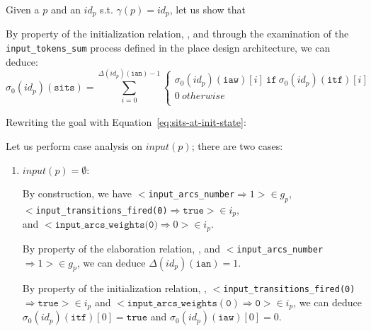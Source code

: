 \documentclass[dvipsnames,12pt]{article}
\begin{document}
\begin{niproof}
  Given a $p$ and an $id_p$ s.t. $\gamma(p)=id_p$, let us show that

  \exP{}
  
  By property of the initialization relation, \InCsCompP{}, and
  through the examination of the \texttt{input\_tokens\_sum} process
  defined in the place design architecture, we can deduce:
  \begin{equation}
    \label{eq:sits-at-init-state}
    \sigma_0(id_p)(\texttt{sits})=\sum\limits_{i=0}^{\Delta(id_p)(\texttt{ian})-1}
    \begin{cases}
      \sigma_0(id_p)(\texttt{iaw})[i]~\mathtt{if}~\sigma_0(id_p)(\texttt{itf})[i]\\
      0~otherwise \\
    \end{cases}
  \end{equation}
  
  Rewriting the goal with Equation~\eqref{eq:sits-at-init-state}:\\

  \noindent{}Let us perform case analysis on $input(p)$; there are two cases:

  \begin{enumerate}
  \item $input(p)=\emptyset$:
    
    By construction, we have
    ${<}$\texttt{input\_arcs\_number}$\Rightarrow{}1{>}\in{}g_p$,\\
    ${<}$\texttt{input\_transitions\_fired(0)}$\Rightarrow{}\mathtt{true}{>}\in{}i_p$,\\
    and
    ${<}\texttt{input\_arcs\_weights(0)}\Rightarrow{}0{>}\in{}i_p$.

  By property of the elaboration relation, \InCsCompP{}, and
  ${<}$\texttt{input\_arcs\_number}$\Rightarrow{}1{>}\in{}g_p$, we
  can deduce $\Delta(id_p)(\texttt{ian})=1$.

  By property of the initialization relation, \InCsCompP,
  ${<}$\texttt{input\_transitions\_fired(0)}$\Rightarrow{}\mathtt{true}{>}\in{}i_p$
  and
  ${<}\mathtt{input\_arcs\_weights(0)\Rightarrow{}0}{>}\in{}i_p$, we
  can deduce $\sigma_0(id_p)(\texttt{itf})[0]=\mathtt{true}$ and
  $\sigma_0(id_p)(\texttt{iaw})[0]=0$.


\end{enumerate}
\end{niproof}
\end{document}
